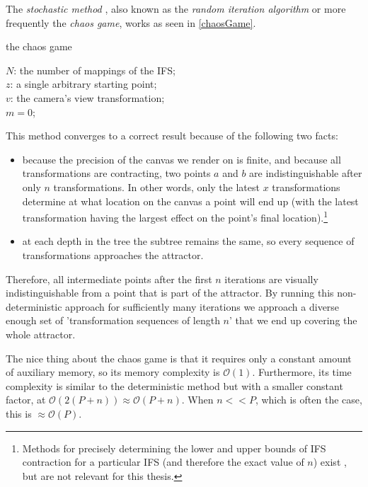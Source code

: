 \documentclass[11pt]{article}
\begin{document}
The \emph{stochastic method} \cite{hepting1991rendering}, also known as the \emph{random iteration algorithm} \cite{barnsley1988fractals} or more frequently the \emph{chaos game}, works as seen in \autoref{chaosGame}.

\begin{algorithm}
\caption{the chaos game}
\label{chaosGame}
  $N$: the number of mappings of the IFS; \\
  $z$: a single arbitrary starting point; \\
  $v$: the camera's view transformation; \\
  $m = 0$; \\
  \For{$m \in [0..n + P)$}{ 
    $i$: a random integer between $0$ and $N$;  \\
    \If{$m \geq n$}{
      render($v(z)$) cumulatively; \\
    }
    $z = f_i(z)$; \\
  }

\end{algorithm}

This method converges to a correct result because of the following two facts:

\begin{itemize}
\item because the precision of the canvas we render on is finite, and because all transformations are contracting,
two points \(a\) and \(b\) are indistinguishable after only \(n\) transformations.
 In other words, only the latest \(x\) transformations determine at what location on the canvas a point will end up (with the latest transformation having the largest effect on the point's final location).\footnote{Methods for precisely determining the lower and upper bounds of IFS contraction for a particular IFS (and therefore the exact value of \(n\)) exist \cite{hepting1991rendering}, 
but are not relevant for this thesis.}
\item at each depth in the tree the subtree remains the same, so every sequence of transformations approaches the attractor.
\end{itemize}

Therefore, all intermediate points after the first \(n\) iterations are visually indistinguishable from a point that is part of the attractor.
By running this non-deterministic approach for sufficiently many iterations we approach a diverse enough set of 'transformation sequences of length \(n\)' that we end up covering the whole attractor.

The nice thing about the chaos game is that it requires only a constant amount of auxiliary memory, so its memory complexity is \(\mathcal{O}(1)\).
Furthermore, its time complexity is similar to the deterministic method but with a smaller constant factor, at \(\mathcal{O}(2(P + n)) \approx \mathcal{O}(P + n)\). When \(n << P\), which is often the case, this is \(\approx \mathcal{O}(P)\).
\end{document}
